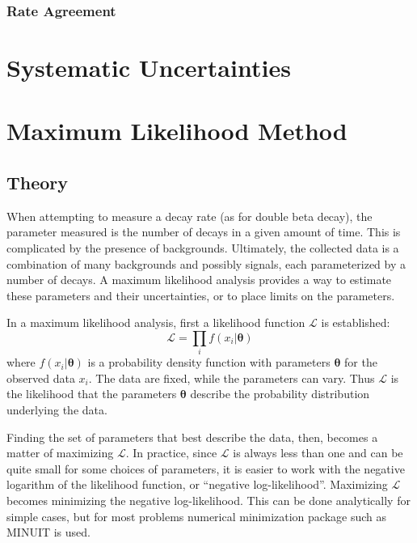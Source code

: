 \documentclass[herrin-thesis.tex]{subfiles}
\begin{document}
\subsubsection{Rate Agreement}

\section{Systematic Uncertainties}

\section{Maximum Likelihood Method}
\subsection{Theory}
When attempting to measure a decay rate (as for double beta decay), the parameter measured is the number of decays in a given amount of time. This is complicated by the presence of backgrounds. Ultimately, the collected data is a combination of many backgrounds and possibly signals, each parameterized by a number of decays. A maximum likelihood analysis provides a way to estimate these parameters and their uncertainties, or to place limits on the parameters.

In a maximum likelihood analysis, first a likelihood function \(\mathcal{L}\) is established:
\begin{equation}
\mathcal{L} = \prod_i f(x_i|\boldsymbol{\theta})
\end{equation}
where \(f(x_i|\boldsymbol{\theta})\) is a probability density function with parameters \(\boldsymbol{\theta}\) for the observed data \(x_i\). The data are fixed, while the parameters can vary. Thus \(\mathcal{L}\) is the likelihood that the parameters \(\boldsymbol{\theta}\) describe the probability distribution underlying the data.

Finding the set of parameters that best describe the data, then, becomes a matter of maximizing \(\mathcal{L}\). In practice, since \(\mathcal{L}\) is always less than one and can be quite small for some choices of parameters, it is easier to work with the negative logarithm of the likelihood function, or ``negative log-likelihood''. Maximizing \(\mathcal{L}\) becomes minimizing the negative log-likelihood. This can be done analytically for simple cases, but for most problems numerical minimization package such as MINUIT\cite{James:1975kx} is used.
\end{document}
